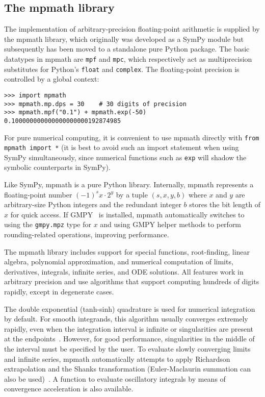 \subsection{The mpmath library}

The implementation of arbitrary-precision floating-point arithmetic is
supplied by the mpmath library, which originally was developed as a SymPy
module but subsequently has been moved to a standalone pure Python package.
The basic datatypes in mpmath are \texttt{mpf} and \texttt{mpc}, which
respectively act as multiprecision substitutes for Python's \texttt{float} and
\texttt{complex}. The floating-point precision is controlled by a global
context:

\begin{verbatim}
>>> import mpmath
>>> mpmath.mp.dps = 30    # 30 digits of precision
>>> mpmath.mpf("0.1") + mpmath.exp(-50)
0.100000000000000000000192874985
\end{verbatim}

For pure numerical computing, it is convenient to use mpmath directly
with \texttt{from mpmath import *} (it is best to avoid such an
import statement when using SymPy simultaneously, since numerical
functions such as \texttt{exp} will shadow the symbolic counterparts
in SymPy).

Like SymPy, mpmath is a pure Python library.
Internally, mpmath represents a floating-point number
${(-1)}^s x \cdot 2^y$ by a tuple $(s, x, y, b)$ where
$x$ and $y$ are arbitrary-size Python integers
and the redundant integer $b$ stores the bit length of $x$ for quick access.
If GMPY~\cite{GMPY} is installed, mpmath automatically switches to
using the \texttt{gmpy.mpz} type for $x$ and using GMPY helper methods
to perform rounding-related operations, improving performance.

The mpmath library includes support for
special functions, root-finding, linear algebra, polynomial approximation,
and numerical computation of limits, derivatives, integrals, infinite
series, and ODE solutions. All features work in arbitrary precision
and use algorithms that support computing hundreds of digits rapidly,
except in degenerate cases.

The double exponential (tanh-sinh) quadrature is used for numerical
integration by default. For smooth integrands, this algorithm usually
converges extremely rapidly, even when the integration interval is infinite
or singularities are present at the endpoints~\cite{takahasi1974double,bailey2005comparison}.
However, for good performance, singularities
in the middle of the interval must be specified
by the user.
To evaluate slowly converging limits and infinite series, mpmath
automatically attempts to apply Richardson extrapolation and the
Shanks transformation
(Euler-Maclaurin summation can also be used)~\cite{BenderOrszag1999}.
A function to evaluate oscillatory integrals by means of convergence
acceleration is also available.

